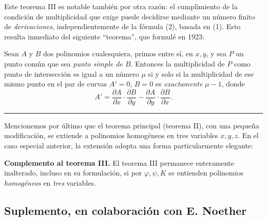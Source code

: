 Este teorema III es notable también por otra razón: el cumplimiento de la condición de multiplicidad que exige puede decidirse mediante un número finito de \emph{derivaciones}, independientemente de la fórmula (2), basada en (1). Esto resulta inmediato del siguiente ``teorema'', que formulé en 1923:

Sean $A$ y $B$ dos polinomios cualesquiera, primos entre sí, en $x,y$, y sea $P$ un punto común que sea \emph{punto simple de $B$}. Entonces la multiplicidad de $P$ como punto de intersección es igual a un número $\mu$ si y solo si la multiplicidad de ese mismo punto en el par de curvas $A'=0$, $B=0$ es \emph{exactamente} $\mu-1$, donde
\[
A'=\frac{\partial A}{\partial x}\cdot\frac{\partial B}{\partial y}
   -\frac{\partial A}{\partial y}\cdot\frac{\partial B}{\partial x}.
\]

\begin{center}
\rule{4cm}{0.4pt}
\end{center}

Mencionemos por último que el teorema principal (teorema II), con una pequeña modificación, se extiende a polinomios homogéneos en tres variables $x,y,z$. En el caso especial anterior, la extensión adopta una forma particularmente elegante:

\textbf{Complemento al teorema III.} El teorema III permanece enteramente inalterado, incluso en su formulación, si por $\varphi,\psi,K$ se entienden polinomios \emph{homogéneos} en \emph{tres} variables.

\subsection*{Suplemento, en colaboración con E. Noether}\label{zusatz-gemeinsam-mit-e.-noether.}

